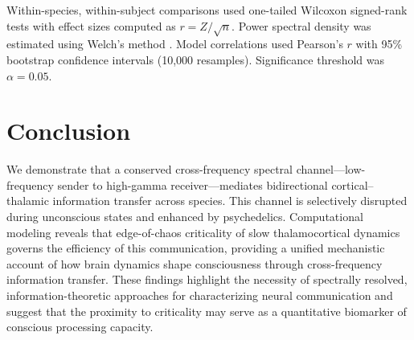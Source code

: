 \documentclass[11pt]{article}
\begin{document}
Within-species, within-subject comparisons used one-tailed Wilcoxon signed-rank tests with effect sizes computed as $r = Z / \sqrt{n}$. Power spectral density was estimated using Welch's method \citep{welch1967use}. Model correlations used Pearson's $r$ with 95\% bootstrap confidence intervals (10,000 resamples). Significance threshold was $\alpha = 0.05$.

\section{Conclusion}

We demonstrate that a conserved cross-frequency spectral channel---low-frequency sender to high-gamma receiver---mediates bidirectional cortical--thalamic information transfer across species. This channel is selectively disrupted during unconscious states and enhanced by psychedelics. Computational modeling reveals that edge-of-chaos criticality of slow thalamocortical dynamics governs the efficiency of this communication, providing a unified mechanistic account of how brain dynamics shape consciousness through cross-frequency information transfer. These findings highlight the necessity of spectrally resolved, information-theoretic approaches for characterizing neural communication and suggest that the proximity to criticality may serve as a quantitative biomarker of conscious processing capacity.



\end{document}
